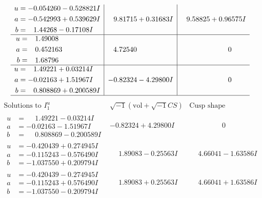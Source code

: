 \documentclass[1p]{elsarticle_modified}
\theoremstyle{definition}
\newcommand{\I}{\sqrt{-1}}
\begin{document}
$$\begin{array}{c|c|c}
\begin{aligned}
u &= -0.054260 - 0.528821 I \\
a &= -0.542993 + 0.539629 I \\
b &= \phantom{-}1.44268 - 0.17108 I\end{aligned}
 & \phantom{-}9.81715 + 0.31683 I & \phantom{-}9.58825 + 0.96575 I \\ \hline\begin{aligned}
u &= \phantom{-}1.49008\phantom{ +0.000000I} \\
a &= \phantom{-}0.452163\phantom{ +0.000000I} \\
b &= \phantom{-}1.68796\phantom{ +0.000000I}\end{aligned}
 & \phantom{-}4.72540\phantom{ +0.000000I} & \phantom{-0.000000 } 0 \\ \hline\begin{aligned}
u &= \phantom{-}1.49221 + 0.03214 I \\
a &= -0.02163 + 1.51967 I \\
b &= \phantom{-}0.808869 + 0.200589 I\end{aligned}
 & -0.82324 - 4.29800 I & \phantom{-0.000000 } 0\\
 \hline 
 \end{array}$$\newpage$$\begin{array}{c|c|c}  
\text{Solutions to }I^u_{1}& \I (\text{vol} + \sqrt{-1}CS) & \text{Cusp shape}\\
 \hline 
\begin{aligned}
u &= \phantom{-}1.49221 - 0.03214 I \\
a &= -0.02163 - 1.51967 I \\
b &= \phantom{-}0.808869 - 0.200589 I\end{aligned}
 & -0.82324 + 4.29800 I & \phantom{-0.000000 } 0 \\ \hline\begin{aligned}
u &= -0.420439 + 0.274945 I \\
a &= -0.115243 - 0.576490 I \\
b &= -1.037550 + 0.209794 I\end{aligned}
 & \phantom{-}1.89083 - 0.25563 I & \phantom{-}4.66041 - 1.63586 I \\ \hline\begin{aligned}
u &= -0.420439 - 0.274945 I \\
a &= -0.115243 + 0.576490 I \\
b &= -1.037550 - 0.209794 I\end{aligned}
 & \phantom{-}1.89083 + 0.25563 I & \phantom{-}4.66041 + 1.63586 I \\ \hline\begin{aligned}

\end{aligned}
\end{array}$$
\end{document}
